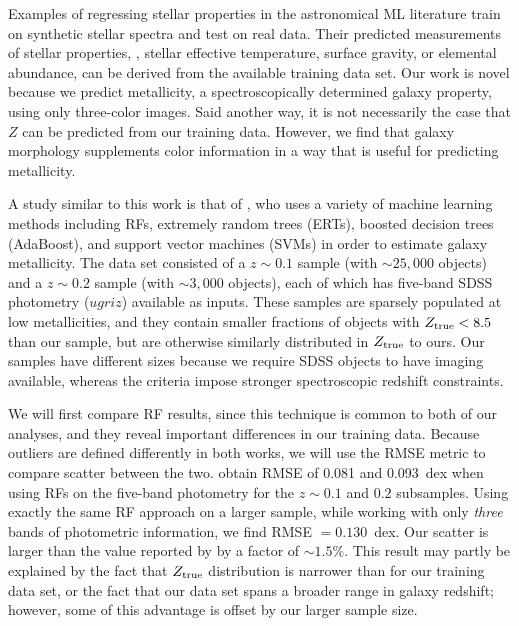 \documentclass[fleqn,usenatbib]{mnras}
\begin{document}
Examples of regressing stellar properties in the astronomical ML literature  train on synthetic stellar spectra and test on real data. Their predicted measurements of stellar properties, \eg, stellar effective temperature, surface gravity, or elemental abundance, can be derived from the available training data set. Our work is novel because we predict metallicity, a spectroscopically determined galaxy property, using only three-color images. Said another way, it is not necessarily the case that $Z$ can be predicted from our training data. However, we find that galaxy morphology supplements color information in a way that is useful for predicting metallicity.

A study similar to this work is that of \cite{Acquaviva2016}, who uses a variety of machine learning methods including RFs, extremely random trees (ERTs), boosted decision trees (AdaBoost), and support vector machines (SVMs) in order to estimate galaxy metallicity. The \cite{Acquaviva2016} data set consisted of a $z \sim 0.1$ sample (with $\sim 25,000$ objects) and a $z \sim 0.2$ sample (with $\sim 3,000$ objects), each of which has five-band SDSS photometry ($ugriz$) available as inputs. These samples are sparsely populated at low metallicities, and they contain smaller fractions of objects with $Z_{\rm true} < 8.5$ than our sample, but are otherwise similarly distributed in $Z_{\rm true}$ to ours. Our samples have different sizes because we require SDSS objects to have imaging available, whereas the \cite{Acquaviva2016} criteria impose stronger spectroscopic redshift constraints.

We will first compare RF results, since this technique is common to both of our analyses, and they reveal important differences in our training data. Because outliers are defined differently in both works, we will use the RMSE metric to compare scatter between the two. \cite{Acquaviva2016} obtain RMSE of 0.081 and 0.093~dex when using RFs on the five-band photometry for the $z \sim 0.1$ and $0.2$ subsamples. Using exactly the same RF approach on a larger sample, while working with only \textit{three} bands of photometric information, we find RMSE $= 0.130$~dex. Our scatter is larger than the value reported by \cite{Acquaviva2016} by a factor of $\sim 1.5\%$. This result may partly be explained by the fact that \cite{Acquaviva2016} $Z_{\rm true}$ distribution is narrower than for our training data set, or the fact that our data set spans a broader range in galaxy redshift; however, some of this advantage is offset by our larger sample size.
\end{document}
